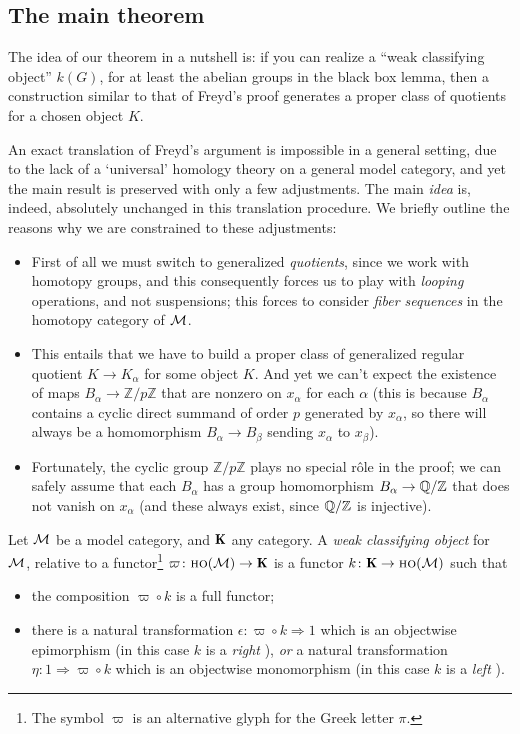\subsection{The main theorem}
\begin{remark}
The idea of our theorem in a nutshell is: if you can realize a ``weak classifying object'' $k(G)$, for at least the abelian groups in the black box lemma, then a construction similar to that of Freyd's proof generates a proper class of quotients for a chosen object $K$.

An exact translation of Freyd's argument is impossible in a general setting, due to the lack of a `universal' homology theory on a general model category, and yet the main result is preserved with only a few adjustments. The main \emph{idea} is, indeed, absolutely unchanged in this translation procedure. We briefly outline the reasons why we are constrained to these adjustments:
\begin{itemize}
	\item First of all we must switch to generalized \emph{quotients}, since we work with homotopy groups, and this consequently forces us to play with \emph{looping} operations, and not suspensions; this forces to consider \emph{fiber sequences} in the homotopy category of $\mathcal{M}$.
	\item This entails that we have to build a proper class of generalized regular quotient $K \to K_\alpha$ for some object $K$. And yet we can't expect the existence of maps $B_\alpha \to \mathbb{Z}/p\mathbb{Z}$ that are nonzero on $x_\alpha$ for each $\alpha$ (this is because $B_\alpha$ contains a cyclic direct summand of order $p$ generated by $x_\alpha$, so there will always be a homomorphism $B_\alpha\to B_\beta$ sending $x_\alpha$ to $x_\beta$).
	\item Fortunately, the cyclic group $\mathbb{Z}/p\mathbb{Z}$ plays no special r\^ole in the proof; we can safely assume that each $B_\alpha$ has a group homomorphism $B_\alpha \to \mathbb{Q}/\mathbb{Z}$ that does not vanish on $x_\alpha$ (and these always exist, since $\mathbb{Q}/\mathbb{Z}$ is injective).
\end{itemize}
\end{remark}
\begin{definition}\label{wcodef}
Let $\mathcal{M}$ be a model category, and $\cate{K}$ any category. A \emph{weak classifying object} for $\mathcal{M}$, relative to a functor\footnote{The symbol $\varpi$ is an alternative glyph for the Greek letter $\pi$.} $\varpi \colon \ho(\M) \to \cate{K}$ is a functor $k\colon \cate{K} \to \ho(\M)$ such that
\begin{itemize}
	\item the composition $\varpi\circ k$ is a full functor;
	\item there is a natural transformation $\epsilon\colon \varpi\circ k \Rightarrow 1$ which is an objectwise epimorphism (in this case $k$ is a \emph{right} \wco), \emph{or} a natural transformation $\eta \colon 1\Rightarrow \varpi\circ k$ which is an objectwise monomorphism (in this case $k$ is a \emph{left} \wco).
\end{itemize}
\end{definition}
